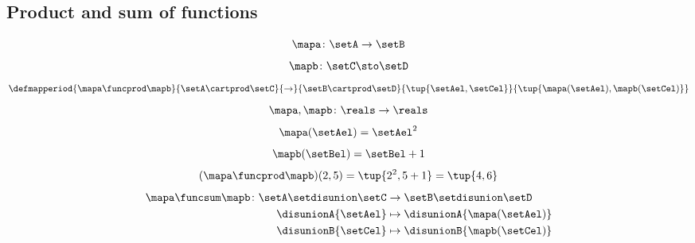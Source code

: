 \begin{forslides}
    \subsection{Product and sum of functions}

    \begin{equation}
        \label{eq:slides_session2_169}
        \mapa\colon \setA\to \setB
    \end{equation}
    \begin{equation}
        \label{eq:slides_session2_170}
        \mapb\colon \setC \sto \setD
    \end{equation}
    \begin{equation}
        \label{eq:slides_session2_171}
        \defmapperiod{
            \mapa \funcprod \mapb
        }{
            \setA \cartprod \setC
        }{
            \to
        }{
            \setB\cartprod \setD
        }{
            \tup{\setAel, \setCel}
        }{
            \tup{\mapa(\setAel),\mapb(\setCel)}
        }
    \end{equation}
    \begin{equation}
        \label{eq:slides_session2_172}
        \mapa,\mapb\colon \reals \to \reals
    \end{equation}
    \begin{equation}
        \label{eq:slides_session2_173}
        \mapa(\setAel)=\setAel^2
    \end{equation}
    \begin{equation}
        \label{eq:slides_session2_174}
        \mapb(\setBel)=\setBel+1
    \end{equation}
    \begin{equation}
        \label{eq:slides_session2_175}
        (\mapa \funcprod \mapb)(2,5)=\tup{2^2,5+1}=\tup{4,6}
    \end{equation}
    \begin{equation}
        \label{eq:slides_session2_176}
        \begin{aligned}
            \mapa \funcsum \mapb \colon \setA \setdisunion \setC & \to \setB\setdisunion \setD \\
            \disunionA{\setAel}                                  & \mapsto \disunionA{\mapa(\setAel)} \\
            \disunionB{\setCel}                                  & \mapsto \disunionB{\mapb(\setCel)} \\
        \end{aligned}
    \end{equation}

\end{forslides}
